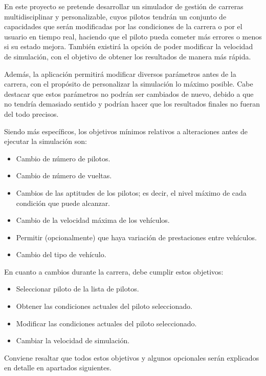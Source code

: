 En este proyecto se pretende desarrollar un simulador de gestión de carreras multidisciplinar y personalizable, cuyos pilotos tendrán un conjunto de capacidades que serán modificadas por las condiciones de la carrera o por el usuario en tiempo real, haciendo que el piloto pueda cometer más errores o menos si su estado mejora. También existirá la opción de poder modificar la velocidad de simulación, con el objetivo de obtener los resultados de manera más rápida.

\bigskip

Además, la aplicación permitirá modificar diversos parámetros antes de la carrera, con el propósito de personalizar la simulación lo máximo posible. Cabe destacar que estos parámetros no podrán ser cambiados de nuevo, debido a que no tendría demasiado sentido y podrían hacer que los resultados finales no fueran del todo precisos.


\bigskip


Siendo más específicos, los objetivos mínimos relativos a alteraciones antes de ejecutar la simulación son:

\begin{itemize}
   \item Cambio de número de pilotos.
   \item Cambio de número de vueltas.
   \item Cambios de las aptitudes de los pilotos; es decir, el nivel máximo de cada condición que puede alcanzar.
   \item Cambio de la velocidad máxima de los vehículos.
   \item Permitir (opcionalmente) que haya variación de prestaciones entre vehículos.
   \item Cambio del tipo de vehículo.
\end{itemize}

\bigskip

En cuanto a cambios durante la carrera, debe cumplir estos objetivos:

\begin{itemize}
   \item Seleccionar piloto de la lista de pilotos.
   \item Obtener las condiciones actuales del piloto seleccionado.
   \item Modificar las condiciones actuales del piloto seleccionado.
   \item Cambiar la velocidad de simulación.
\end{itemize}

Conviene resaltar que todos estos objetivos y algunos opcionales serán explicados en detalle en apartados siguientes.

